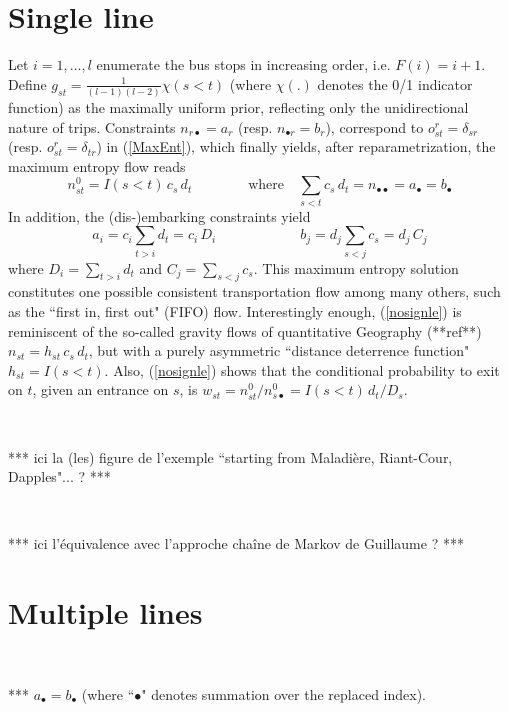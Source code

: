 \documentclass{llncs}
\begin{document}
\section{Single line}
\label{Single line}
Let  $i=1,\ldots, l$ enumerate the bus stops in increasing order,  i.e. $F(i)=i+1$. Define $g_{st}=\frac{1}{(l-1)(l-2)}\chi(s<t)$ (where $\chi(.)$ denotes the 0/1  indicator function) as the maximally uniform prior, reflecting only the unidirectional nature of trips. 
Constraints $n_{r\bullet}=a_r$ (resp. $n_{\bullet r}=b_r$), correspond to $o^r_{st}=
\delta_{sr}$ (resp. $o^r_{st}=\delta_{tr}$) in (\ref{MaxEnt}), which finally yields, after reparametrization, the maximum entropy flow reads
\begin{equation}
\label{nosignle}
n^0_{st}=I(s<t)\, c_s\, d_t \qquad\qquad\mbox{where}\quad \sum_{s<t}c_s\, d_t=n_{\bullet\bullet}=a_{\bullet}=b_\bullet
\end{equation}
In addition, the (dis-)embarking constraints  yield
\begin{equation}
\label{(dis embarking constraints}
a_i=c_i \sum_{t>i}d_t=c_i\, D_i 
\qquad\qquad\qquad
b_j=d_j\sum_{s<j}c_s=d_j \, C_j  
\end{equation}
where $D_i=\sum_{t>i}d_t$ and $C_j=\sum_{s<j}c_s$. This maximum entropy solution constitutes one possible consistent transportation flow among many others, such as the ``first in, first out" (FIFO) flow. Interestingly enough, (\ref{nosignle}) is reminiscent of the so-called gravity flows of quantitative Geography (**ref**) $n_{st}=h_{st}\, c_s\, d_t $, but with a purely asymmetric ``distance deterrence function" $h_{st}=I(s<t)$.  Also, 
(\ref{nosignle}) shows that  the conditional probability to exit on $t$, given an entrance on $s$, is $w_{st}=n^0_{st}/n^0_{s\bullet}=I(s<t)\, d_t/D_s$. 


\

*** ici la (les) figure de l'exemple  ``starting from Maladière, Riant-Cour, Dapples"... ? ***

\


*** ici l'équivalence avec l'approche chaîne de Markov de Guillaume ? ***
 


\section{Multiple lines} 

*** $a_{\bullet}=b_{\bullet}$ (where ``$\bullet$" denotes summation over the replaced index). 
 
\end{document}
